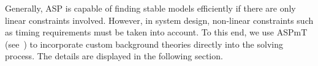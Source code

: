 Generally, \ac{ASP} is capable of finding stable models efficiently if there are only linear constraints involved. However, in system design, non-linear constraints such as timing requirements must be taken into account. To this end, we use \acf{ASPmT} (see~\cite{gekakaosscwa16a}) to incorporate custom background theories directly into the solving process. The details are displayed in the following section.%









